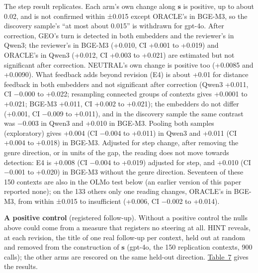 \documentclass[
  10pt,
]{article}
\begin{document}
The step result replicates. Each arm's
own change along \(\mathbf{s}\) is
positive, up to about 0.02, and is not
confirmed within ±0.015 except ORACLE's
in BGE-M3, so the discovery sample's
``at most about 0.015'' is withdrawn for
gpt-4o. After correction, GEO's turn is
detected in both embedders and the
reviewer's in Qwen3; the reviewer's in
BGE-M3 (+0.010, CI +0.001 to +0.019) and
ORACLE's in Qwen3 (+0.012, CI +0.003 to
+0.021) are estimated but not
significant after correction. NEUTRAL's
own change is positive too (+0.0085 and
+0.0090). What feedback adds beyond
revision (E4) is about +0.01 for
distance feedback in both embedders and
not significant after correction (Qwen3
+0.011, CI −0.000 to +0.022; resampling
connected groups of contexts gives
+0.0001 to +0.021; BGE-M3 +0.011, CI
+0.002 to +0.021); the embedders do not
differ (+0.001, CI −0.009 to +0.011),
and in the discovery sample the same
contrast was −0.003 in Qwen3 and +0.010
in BGE-M3. Pooling both samples
(exploratory) gives +0.004 (CI −0.004 to
+0.011) in Qwen3 and +0.011 (CI +0.004
to +0.018) in BGE-M3. Adjusted for step
change, after removing the genre
direction, or in units of the gap, the
reading does not move towards detection:
E4 is +0.008 (CI −0.004 to +0.019)
adjusted for step, and +0.010 (CI −0.001
to +0.020) in BGE-M3 without the genre
direction. Seventeen of these 150
contexts are also in the OLMo test below
(an earlier version of this paper
reported none); on the 133 others only
one reading changes, ORACLE's in BGE-M3,
from within ±0.015 to insufficient
(+0.006, CI −0.002 to +0.014).

\textbf{A positive control} (registered
follow-up). Without a positive control
the nulls above could come from a
measure that registers no steering at
all. HINT reveals, at each revision, the
title of one real follow-up per context,
held out at random and removed from the
construction of \(\mathbf{s}\) (gpt-4o,
the 150 replication contexts, 900
calls); the other arms are rescored on
the same held-out direction.
\hyperref[tab:7]{Table~7} gives the
results.
\end{document}
